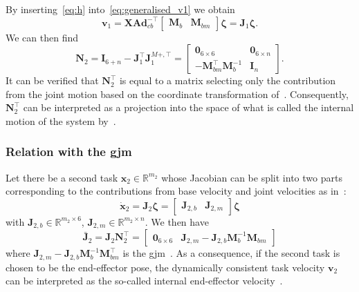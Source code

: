 \documentclass[../main.tex]{subfiles}
\begin{document}
By inserting~\eqref{eq:h} into~\eqref{eq:generalised_v1} we obtain
\begin{equation}\label{eq:J1_general}
    \bm{v}_1 = \bm{X} \bm{Ad}_{cb}^{-\top} \begin{bmatrix}
        \bm{M}_b & \bm{M}_{bm}
    \end{bmatrix}  \bm{\zeta} = \bm{J}_1 \bm{\zeta} .
\end{equation}
%
We can then find
\begin{equation}\label{eq:N2_momentum}
    \bm{N}_2 = \bm{I}_{6+n} - \bm{J}_1^\top \bm{J}_1^{M+,\top} = \begin{bmatrix}
        \bm{0}_{6 \times 6} & \bm{0}_{6 \times n}\\ -\bm{M}_{bm}^\top \bm{M}_b^{-1} & \bm{I}_n
    \end{bmatrix} .
\end{equation}
    It can be verified that $\bm{N}_2^\top$ is equal to a matrix selecting only the contribution from the joint motion based on the coordinate transformation of~\cite{Garofalo2015}. %
Consequently, $\bm{N}_2^\top$ can be interpreted as a projection into the space of what is called the internal motion of the system by~\cite{Giordano2018}.


\subsubsection{Relation with the \gls{gjm}}
Let there be a second task $\bm{x}_2 \in \mathbb{R}^{m_2}$ whose Jacobian can be split into two parts corresponding to the contributions from base velocity and joint velocities as in~\cite{Umetani1989}:
\begin{equation}
    \dot{\bm{x}}_2 = \bm{J}_2 \bm{\zeta} = \begin{bmatrix}
        \bm{J}_{2,b} & \bm{J}_{2,m}
    \end{bmatrix} \bm{\zeta}
\end{equation}
with $\bm{J}_{2,b} \in \mathbb{R}^{m_2 \times 6}$, $\bm{J}_{2,m} \in \mathbb{R}^{m_2 \times n}$. We then have
\begin{equation}
        \bar{\bm{J}}_2 = \bm{J}_2 \bm{N}_2^\top = \begin{bmatrix}
        \bm{0}_{6 \times 6} & \bm{J}_{2,m} - \bm{J}_{2,b} \bm{M}_b^{-1} \bm{M}_{bm}
    \end{bmatrix}
\end{equation}
where $\bm{J}_{2,m} - \bm{J}_{2,b} \bm{M}_b^{-1} \bm{M}_{bm}^\top$ is the \gls{gjm}~\citep{Umetani1989}. As a consequence, if the second task is chosen to be the end-effector pose, the dynamically consistent task velocity $\bm{v}_2$ can be interpreted as the so-called internal end-effector velocity~\citep{Giordano2018}.
\end{document}
